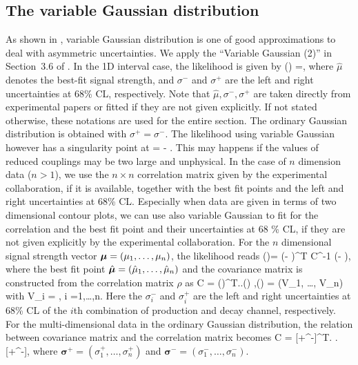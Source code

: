 \subsection*{The variable Gaussian distribution}
As shown in \cite{Barlow:2004wg}, variable Gaussian distribution is one of good approximations to deal with 
asymmetric uncertainties. We apply the  ``Variable Gaussian (2)''  in  Section~3.6 of \cite{Barlow:2004wg}. 
In the 1D interval case, the likelihood is given by
\be \logL(\mu) =,\ee
where $\hat\mu$ denotes the best-fit signal strength, and $\sigma^-$ and $\sigma^+$ are the left and right uncertainties at 68\%
CL, respectively. Note that $\hat\mu, \sigma^-,\sigma^+$ are taken directly from experimental papers or fitted
if they are not given explicitly. If not stated otherwise, these notations are used for the entire section. 
The ordinary Gaussian distribution is obtained with  $\sigma^+ =\sigma^-$. The likelihood using variable Gaussian
however has a singularity point  at 
\be \mu= \hat\mu - \frac{\sigma^+\sigma^-}{\sigma^+ -\sigma^-}.\ee
This may happens if the values of reduced couplings may be two large and unphysical.
 In the case
of $n$ dimension data ($n>1$), we use the $n\times n$ correlation matrix  given by the experimental collaboration, if it is available,
together with the best fit points and the left and right uncertainties at 68\% CL.
Especially when data are given in terms of two dimensional contour plots, we can use also variable Gaussian to fit for the correlation and the best fit point and their uncertainties at 68 \% CL, if they are not given explicitly by the experimental collaboration. For the $n$ dimensional signal strength vector $\bm{\mu} = (\mu_1,\ldots,\mu_n)$, the likelihood reads
\be \logL(\bmu)= (\bmu - \hbmu)^T C^{-1} (\bmu - \hbmu ), \ee
where the best fit point $\hat{\bm{\mu}} = (\hat\mu_1,\ldots,\hat\mu_n)$ and the covariance matrix is constructed from the correlation matrix 
$\rho$ as
\be C = (\bmu)^T.\rho.(\bmu) ,\quad {}(\bmu) = (V_1, \ldots, V_n) \ee
with
\be V_i = , \quad i =1,\ldots,n.\ee
Here the $\sigma^-_i$ and $\sigma^+_i$ are the left and right uncertainties at 68\% CL of the $i$th combination of production and decay channel, respectively. For the multi-dimensional data in the ordinary Gaussian distribution, the relation between covariance matrix and the correlation matrix becomes
\be C =  [\bm{\sigma^+}+\bm{\sigma}^-]^T. \rho.[\bm{\sigma^+}+\bm{\sigma}^-], \ee
where $\bm{\sigma^+}=(\sigma_1^+, \ldots,\sigma_n^+)$ and $\bm{\sigma^-}=(\sigma_1^-, \ldots,\sigma_n^-)$.


